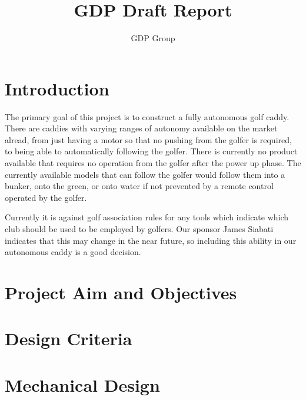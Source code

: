 \documentclass[11pt,landscape]{article}
\title{GDP Draft Report}
\author{GDP Group}
\begin{document}
\maketitle
\newpage
\begin{multicols}{3}
\tableofcontents
\newpage
\section{Introduction}
The primary goal of this project is to construct a fully autonomous golf caddy.
There are caddies with varying ranges of autonomy available on the market
alread, from just having a motor so that no pushing from the golfer is required,
to being able to automatically following the golfer. There is currently no
product available that requires no operation from the golfer after the power up
phase. The currently available models that can follow the golfer would follow
them into a bunker, onto the green, or onto water if not prevented by a remote
control operated by the golfer.

Currently it is against golf association rules for any tools which indicate
which club should be used to be employed by golfers. Our sponsor James Siabati
indicates that this may change in the near future, so including this ability in
our autonomous caddy is a good decision.
\section{Project Aim and Objectives}
\section{Design Criteria}
\section{Mechanical Design}



\end{multicols}
\end{document}

